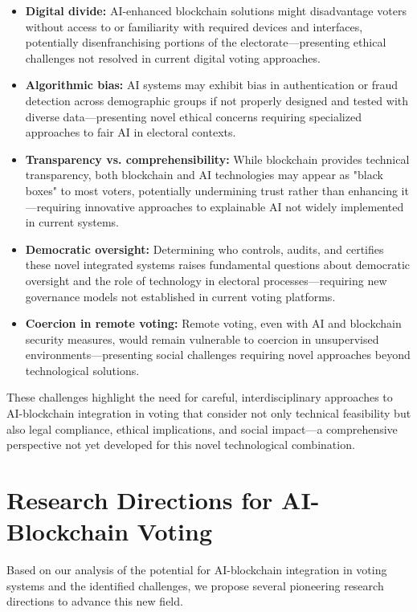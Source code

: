 \documentclass[conference]{IEEEtran}
\begin{document}
\begin{itemize}
    \item \textbf{Digital divide:} AI-enhanced blockchain solutions might disadvantage voters without access to or familiarity with required devices and interfaces, potentially disenfranchising portions of the electorate—presenting ethical challenges not resolved in current digital voting approaches.
    
    \item \textbf{Algorithmic bias:} AI systems may exhibit bias in authentication or fraud detection across demographic groups if not properly designed and tested with diverse data—presenting novel ethical concerns requiring specialized approaches to fair AI in electoral contexts.
    
    \item \textbf{Transparency vs. comprehensibility:} While blockchain provides technical transparency, both blockchain and AI technologies may appear as "black boxes" to most voters, potentially undermining trust rather than enhancing it—requiring innovative approaches to explainable AI not widely implemented in current systems.
    
    \item \textbf{Democratic oversight:} Determining who controls, audits, and certifies these novel integrated systems raises fundamental questions about democratic oversight and the role of technology in electoral processes—requiring new governance models not established in current voting platforms.
    
    \item \textbf{Coercion in remote voting:} Remote voting, even with AI and blockchain security measures, would remain vulnerable to coercion in unsupervised environments—presenting social challenges requiring novel approaches beyond technological solutions.
\end{itemize}

These challenges highlight the need for careful, interdisciplinary approaches to AI-blockchain integration in voting that consider not only technical feasibility but also legal compliance, ethical implications, and social impact—a comprehensive perspective not yet developed for this novel technological combination.

\section{Research Directions for AI-Blockchain Voting}
Based on our analysis of the potential for AI-blockchain integration in voting systems and the identified challenges, we propose several pioneering research directions to advance this new field.
\end{document}
